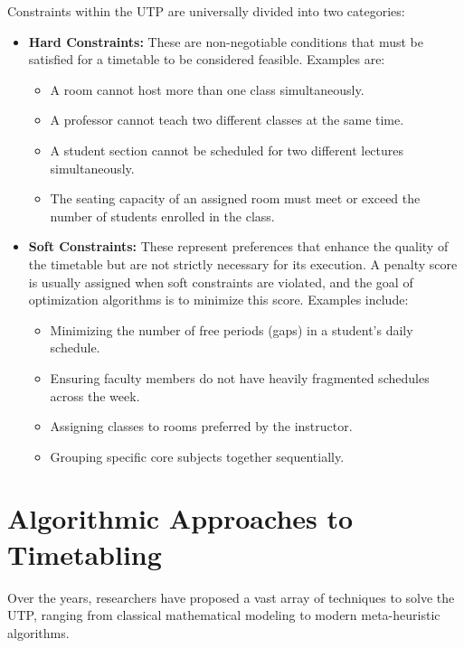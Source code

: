 Constraints within the UTP are universally divided into two categories:
\begin{itemize}
    \item \textbf{Hard Constraints:} These are non-negotiable conditions that must be satisfied for a timetable to be considered feasible. Examples are:
    \begin{itemize}
        \item A room cannot host more than one class simultaneously.
        \item A professor cannot teach two different classes at the same time.
        \item A student section cannot be scheduled for two different lectures simultaneously.
        \item The seating capacity of an assigned room must meet or exceed the number of students enrolled in the class.
    \end{itemize}
    \item \textbf{Soft Constraints:} These represent preferences that enhance the quality of the timetable but are not strictly necessary for its execution. A penalty score is usually assigned when soft constraints are violated, and the goal of optimization algorithms is to minimize this score. Examples include:
    \begin{itemize}
        \item Minimizing the number of free periods (gaps) in a student's daily schedule.
        \item Ensuring faculty members do not have heavily fragmented schedules across the week.
        \item Assigning classes to rooms preferred by the instructor.
        \item Grouping specific core subjects together sequentially.
    \end{itemize}
\end{itemize}

\section{Algorithmic Approaches to Timetabling}

Over the years, researchers have proposed a vast array of techniques to solve the UTP, ranging from classical mathematical modeling to modern meta-heuristic algorithms. 

